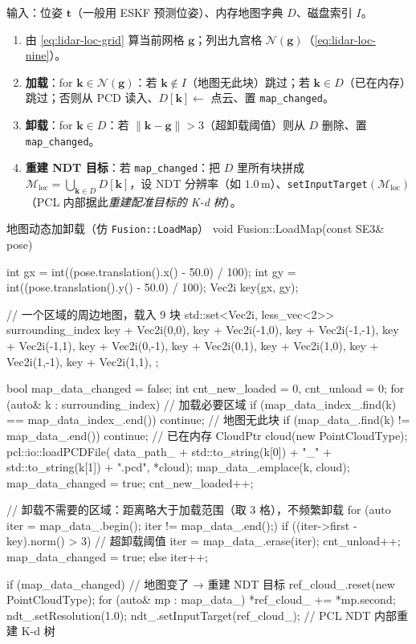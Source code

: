 \begin{algo}\label{alg:lidar-loc-loadmap}
输入：位姿 $\mathbf t$（一般用 ESKF 预测位姿）、内存地图字典 $D$、磁盘索引 $I$。
\begin{enumerate}
  \item 由 \cref{eq:lidar-loc-grid} 算当前网格 $\mathbf g$；列出九宫格 $\mathcal N(\mathbf g)$（\cref{eq:lidar-loc-nine}）。
  \item \textbf{加载}：for $\mathbf k\in\mathcal N(\mathbf g)$：若 $\mathbf k\notin I$（地图无此块）跳过；若 $\mathbf k\in D$（已在内存）跳过；否则从 PCD 读入、$D[\mathbf k]\!\leftarrow$ 点云、置 \texttt{map\_changed}。
  \item \textbf{卸载}：for $\mathbf k\in D$：若 $\|\mathbf k-\mathbf g\| > 3$（超卸载阈值）则从 $D$ 删除、置 \texttt{map\_changed}。
  \item \textbf{重建 NDT 目标}：若 \texttt{map\_changed}：把 $D$ 里所有块拼成 $\mathcal M_{\mathrm{loc}}=\bigcup_{\mathbf k\in D}D[\mathbf k]$，设 NDT 分辨率（如 $1.0$\,m）、\texttt{setInputTarget}$(\mathcal M_{\mathrm{loc}})$（PCL 内部据此\emph{重建配准目标的 K-d 树}）。
\end{enumerate}
\end{algo}

\begin{codebox}[C++]{地图动态加卸载（仿 \texttt{Fusion::LoadMap}）}
void Fusion::LoadMap(const SE3& pose) {
  int gx = int((pose.translation().x() - 50.0) / 100);
  int gy = int((pose.translation().y() - 50.0) / 100);
  Vec2i key(gx, gy);

  // 一个区域的周边地图，载入 9 块
  std::set<Vec2i, less_vec<2>> surrounding_index{
    key + Vec2i(0,0),  key + Vec2i(-1,0), key + Vec2i(-1,-1), key + Vec2i(-1,1),
    key + Vec2i(0,-1), key + Vec2i(0,1),  key + Vec2i(1,0),
    key + Vec2i(1,-1), key + Vec2i(1,1),
  };

  bool map_data_changed = false;
  int cnt_new_loaded = 0, cnt_unload = 0;
  for (auto& k : surrounding_index) {                  // 加载必要区域
    if (map_data_index_.find(k) == map_data_index_.end()) continue;  // 地图无此块
    if (map_data_.find(k) != map_data_.end()) continue;              // 已在内存
    CloudPtr cloud(new PointCloudType);
    pcl::io::loadPCDFile(
        data_path_ + std::to_string(k[0]) + "_" + std::to_string(k[1]) + ".pcd", *cloud);
    map_data_.emplace(k, cloud);
    map_data_changed = true; cnt_new_loaded++;
  }

  // 卸载不需要的区域：距离略大于加载范围（取 3 格），不频繁卸载
  for (auto iter = map_data_.begin(); iter != map_data_.end();) {
    if ((iter->first - key).norm() > 3) {              // 超卸载阈值
      iter = map_data_.erase(iter);
      cnt_unload++; map_data_changed = true;
    } else { iter++; }
  }

  if (map_data_changed) {                              // 地图变了 → 重建 NDT 目标
    ref_cloud_.reset(new PointCloudType);
    for (auto& mp : map_data_) { *ref_cloud_ += *mp.second; }
    ndt_.setResolution(1.0);
    ndt_.setInputTarget(ref_cloud_);                   // PCL NDT 内部重建 K-d 树
  }
}
\end{codebox}

